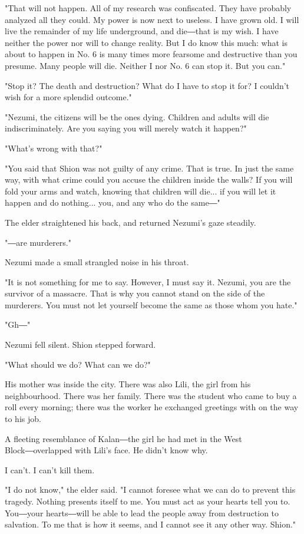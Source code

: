 "That will not happen. All of my research was confiscated. They have
probably analyzed all they could. My power is now next to useless. I
have grown old. I will live the remainder of my life underground, and
die―that is my wish. I have neither the power nor will to change
reality. But I do know this much: what is about to happen in No. 6 is
many times more fearsome and destructive than you presume. Many people
will die. Neither I nor No. 6 can stop it. But you can."

"Stop it? The death and destruction? What do I have to stop it for? I
couldn't wish for a more splendid outcome."

"Nezumi, the citizens will be the ones dying. Children and adults will
die indiscriminately. Are you saying you will merely watch it happen?"

"What's wrong with that?"

"You said that Shion was not guilty of any crime. That is true. In just
the same way, with what crime could you accuse the children inside the
walls? If you will fold your arms and watch, knowing that children will
die... if you will let it happen and do nothing... you, and any who do
the same―"

The elder straightened his back, and returned Nezumi's gaze steadily.

"―are murderers."

Nezumi made a small strangled noise in his throat.

"It is not something for me to say. However, I must say it. Nezumi, you
are the survivor of a massacre. That is why you cannot stand on the side
of the murderers. You must not let yourself become the same as those
whom you hate."

"Gh―"

Nezumi fell silent. Shion stepped forward.

"What should we do? What can we do?"

His mother was inside the city. There was also Lili, the girl from his
neighbourhood. There was her family. There was the student who came to
buy a roll every morning; there was the worker he exchanged greetings
with on the way to his job.

A fleeting resemblance of Kalan―the girl he had met in the West
Block―overlapped with Lili's face. He didn't know why.

I can't. I can't kill them.

"I do not know," the elder said. "I cannot foresee what we can do to
prevent this tragedy. Nothing presents itself to me. You must act as
your hearts tell you to. You―your hearts―will be able to lead the people
away from destruction to salvation. To me that is how it seems, and I
cannot see it any other way. Shion."

